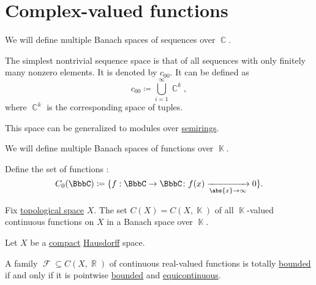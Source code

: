 \section{Complex-valued functions}\label{sec:complex_valued_functions}

\begin{definition}\label{def:coordinate_spaces}
  We will define multiple Banach spaces of sequences over \( \BbbC \).

  \begin{thmenum}
     The simplest nontrivial sequence space is that of all sequences with only finitely many nonzero elements. It is denoted by \( c_{00} \). It can be defined as
    \begin{equation*}
      c_{00} \coloneqq \bigcup_{i=1}^\infty \BbbC^k,
    \end{equation*}
    where \( \BbbC^k \) is the corresponding space of tuples.

    This space can be generalized to modules over \hyperref[def:module]{semirings}.
  \end{thmenum}
\end{definition}

\begin{definition}\label{def:function_spaces}
  We will define multiple Banach spaces of functions over \( \BbbK \).

  \begin{thmenum}
     Define the set of functions :
    \begin{equation*}
      C_0(\BbbC) \coloneqq \{ f: \BbbC \to \BbbC \colon f(x) \xrightarrow[\abs{x} \to \infty]{} 0 \}.
    \end{equation*}

     Fix \hyperref[def:topological_space]{topological space} \( X \). The set \( C(X) = C(X, \BbbK) \) of all \( \BbbK \)-valued continuous functions on \( X \) in a Banach space over \( \BbbK \).
  \end{thmenum}
\end{definition}

\begin{theorem}\label{thm:arzela_ascoli}
  Let \( X \) be a \hyperref[def:compact_space]{compact} \hyperref[def:separation_axioms/T2]{Hausdorff} space.

  A family \( \mscrF \subseteq C(X, \BbbR) \) of continuous real-valued functions is totally \hyperref[def:totally_bounded_set]{bounded} if and only if it is pointwise \hyperref[def:bounded_function/pointwise]{bounded} and \hyperref[def:function_set_continuity/equicontinuous]{equicontinuous}.
\end{theorem}
